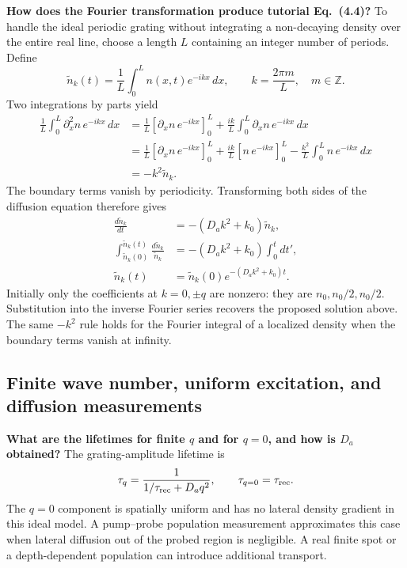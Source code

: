 \textbf{How does the Fourier transformation produce tutorial Eq.~(4.4)?}
To handle the ideal periodic grating without integrating a non-decaying density over the entire real line, choose a length $L$ containing an integer number of periods. Define
\begin{equation}
\widetilde n_k(t)=\frac1L\int_0^L n(x,t)e^{-ikx}\,dx,
\qquad k=\frac{2\pi m}{L},\quad m\in\mathbb Z.
\end{equation}
Two integrations by parts yield
\begin{align}
\frac1L\int_0^L\partial_x^2n\,e^{-ikx}\,dx
&=\frac1L[\partial_xn\,e^{-ikx}]_0^L
 +\frac{ik}{L}\int_0^L\partial_xn\,e^{-ikx}\,dx\\
&=\frac1L[\partial_xn\,e^{-ikx}]_0^L
 +\frac{ik}{L}[n\,e^{-ikx}]_0^L
 -\frac{k^2}{L}\int_0^L n\,e^{-ikx}\,dx\\
&=-k^2\widetilde n_k.
\end{align}
The boundary terms vanish by periodicity. Transforming both sides of the diffusion equation therefore gives
\begin{align}
\frac{d\widetilde n_k}{dt}
&=-(D_ak^2+k_0)\widetilde n_k,\\
\int_{\widetilde n_k(0)}^{\widetilde n_k(t)}
\frac{d\widetilde n_k}{\widetilde n_k}
&=-(D_ak^2+k_0)\int_0^t dt',\\
\widetilde n_k(t)&=\widetilde n_k(0)e^{-(D_ak^2+k_0)t}.
\end{align}
Initially only the coefficients at $k=0,\pm q$ are nonzero: they are $n_0,n_0/2,n_0/2$. Substitution into the inverse Fourier series recovers the proposed solution above. The same $-k^2$ rule holds for the Fourier integral of a localized density when the boundary terms vanish at infinity.

\subsection{Finite wave number, uniform excitation, and diffusion measurements}
\textbf{What are the lifetimes for finite $q$ and for $q=0$, and how is $D_a$ obtained?}
The grating-amplitude lifetime is
\begin{equation}
\tau_q=\frac{1}{1/\tau_{\rm rec}+D_aq^2},
\qquad \tau_{q=0}=\tau_{\rm rec}.
\end{equation}
The $q=0$ component is spatially uniform and has no lateral density gradient in this ideal model. A pump--probe population measurement approximates this case when lateral diffusion out of the probed region is negligible. A real finite spot or a depth-dependent population can introduce additional transport.

